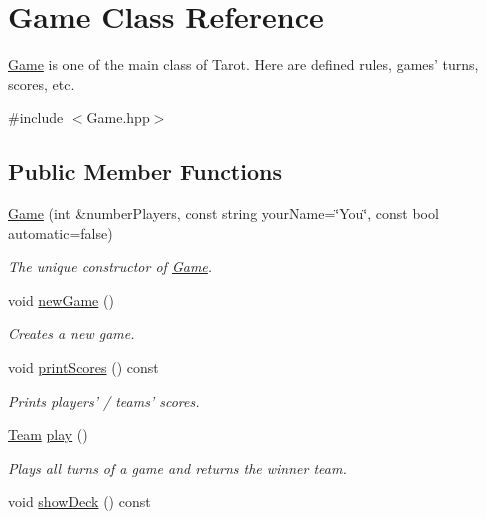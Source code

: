 \hypertarget{classGame}{\section{Game Class Reference}
\label{classGame}
}


\hyperlink{classGame}{Game} is one of the main class of Tarot. Here are defined rules, games' turns, scores, etc.  




{\ttfamily \#include $<$Game.\-hpp$>$}

\subsection*{Public Member Functions}
\begin{DoxyCompactItemize}
\item 
\hyperlink{classGame_a584bfe348c8e1128dbb4b1fb40a05f0b}{Game} (int \&number\-Players, const string your\-Name=\char`\"{}You\char`\"{}, const bool automatic=false)
\begin{DoxyCompactList}\small\item\em The unique constructor of \hyperlink{classGame}{Game}. \end{DoxyCompactList}\item 
\hypertarget{classGame_a12f32ba70a35a0dcd1f527b4d4a0d2c4}{void \hyperlink{classGame_a12f32ba70a35a0dcd1f527b4d4a0d2c4}{new\-Game} ()}\label{classGame_a12f32ba70a35a0dcd1f527b4d4a0d2c4}

\begin{DoxyCompactList}\small\item\em Creates a new game. \end{DoxyCompactList}\item 
\hypertarget{classGame_acb39f55a7b0b1d0d35b06d305a508dd4}{void \hyperlink{classGame_acb39f55a7b0b1d0d35b06d305a508dd4}{print\-Scores} () const }\label{classGame_acb39f55a7b0b1d0d35b06d305a508dd4}

\begin{DoxyCompactList}\small\item\em Prints players' / teams' scores. \end{DoxyCompactList}\item 
\hypertarget{classGame_a6a76e181e24425eb361960d5b5d184bd}{\hyperlink{classTeam}{Team} \hyperlink{classGame_a6a76e181e24425eb361960d5b5d184bd}{play} ()}\label{classGame_a6a76e181e24425eb361960d5b5d184bd}

\begin{DoxyCompactList}\small\item\em Plays all turns of a game and returns the winner team. \end{DoxyCompactList}\item 
\hypertarget{classGame_a1e9e48c10a9ca4bc66b69e05b983e3ab}{void \hyperlink{classGame_a1e9e48c10a9ca4bc66b69e05b983e3ab}{show\-Deck} () const }\label{classGame_a1e9e48c10a9ca4bc66b69e05b983e3ab}


\end{DoxyCompactItemize}
